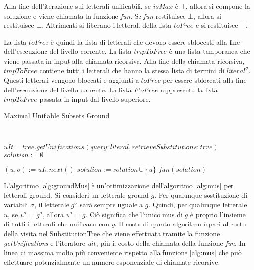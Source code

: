 \documentclass[./main.tex]{subfiles}
\begin{document}
Alla fine dell'iterazione sui letterali unificabili, se $isMax$ è $\top$, 
allora si compone la soluzione e viene chiamata la funzione \textit{fun}.
Se \textit{fun} restituisce $\bot$, allora si restituisce $\bot$.
Altrimenti si liberano i letterali della lista $toFree$ e si restituisce $\top$.

La lista $toFree$ è quindi la lista di letterali che devono essere sbloccati alla fine dell'esecuzione del livello corrente.
La lista $tmpToFree$ è una lista temporanea che viene passata in input alla chiamata ricorsiva. 
Alla fine della chiamata ricorsiva, $tmpToFree$ contiene tutti i letterali che hanno la stessa lista di termini di $literal^\sigma$.
Questi letterali vengono bloccati e aggiunti a $toFree$ per essere sbloccati alla fine dell'esecuzione del livello corrente.
La lista $FtoFree$ rappresenta la lista $tmpToFree$ passata in input dal livello superiore.


\begin{algorithm}[H] \label{alg:groundMus}
    \caption{Maximal Unifiable Subsets Ground}
    \\

$uIt = tree.getUnifications(query: literal, retrieveSubstitutions: true)$\;
$solution := \emptyset$\;

 {
    $(u, \sigma) := uIt.next()$\;
     {
        $solution := solution \cup \{u\}$\;
    }
}
\Return $fun(solution)$\;
\end{algorithm}

L'algoritmo \ref{alg:groundMus} è un'ottimizzazione dell'algoritmo \ref{alg:mus} per letterali ground.
Si consideri un letterale ground $g$. Per qualunque sostituzione di variabili $\sigma$, 
il letterale $g^\sigma$ sarà sempre uguale a $g$. Quindi, per qualunque letterale $u$, se $u^\sigma = g^\sigma$, allora $u^\sigma = g$.
Ciò significa che l'unico mus di $g$ è proprio l'insieme di tutti i letterali che unificano con $g$.
Il costo di questo algoritmo è pari al costo della visita nel SubstitutionTree che viene effettuata tramite la funzione \textit{getUnifications}
e l'iteratore $uit$,
più il costo della chiamata della funzione \textit{fun}.
In linea di massima molto più conveniente rispetto alla funzione \ref{alg:mus} che può effettuare potenzialmente un numero esponenziale 
di chiamate ricorsive. 
\end{document}
